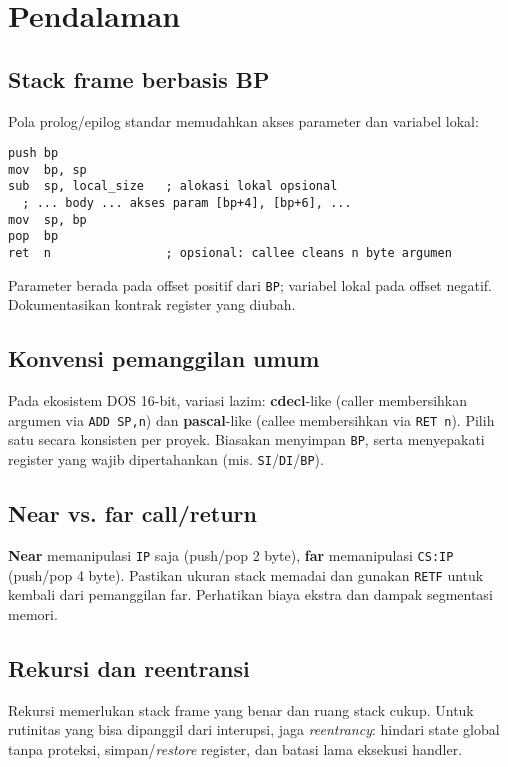 \section{Pendalaman}\label{sec:stack-pendalaman}
\subsection{Stack frame berbasis BP}
Pola prolog/epilog standar memudahkan akses parameter dan variabel lokal:
\begin{verbatim}
push bp
mov  bp, sp
sub  sp, local_size   ; alokasi lokal opsional
  ; ... body ... akses param [bp+4], [bp+6], ...
mov  sp, bp
pop  bp
ret  n                ; opsional: callee cleans n byte argumen
\end{verbatim}
Parameter berada pada offset positif dari \texttt{BP}; variabel lokal pada offset negatif. Dokumentasikan kontrak register yang diubah. \cite{intel2019manual32}

\subsection{Konvensi pemanggilan umum}
Pada ekosistem DOS 16-bit, variasi lazim: \textbf{cdecl}-like (caller membersihkan argumen via \texttt{ADD SP,n}) dan \textbf{pascal}-like (callee membersihkan via \texttt{RET n}). Pilih satu secara konsisten per proyek. Biasakan menyimpan \texttt{BP}, serta menyepakati register yang wajib dipertahankan (mis. \texttt{SI}/\texttt{DI}/\texttt{BP}). \cite{osdev_wiki}

\subsection{Near vs. far call/return}
\textbf{Near} memanipulasi \texttt{IP} saja (push/pop 2 byte), \textbf{far} memanipulasi \texttt{CS:IP} (push/pop 4 byte). Pastikan ukuran stack memadai dan gunakan \texttt{RETF} untuk kembali dari pemanggilan far. Perhatikan biaya ekstra dan dampak segmentasi memori. \cite{intel2019manual32}

\subsection{Rekursi dan reentransi}
Rekursi memerlukan stack frame yang benar dan ruang stack cukup. Untuk rutinitas yang bisa dipanggil dari interupsi, jaga \textit{reentrancy}: hindari state global tanpa proteksi, simpan/\textit{restore} register, dan batasi lama eksekusi handler. \cite{rbil}


